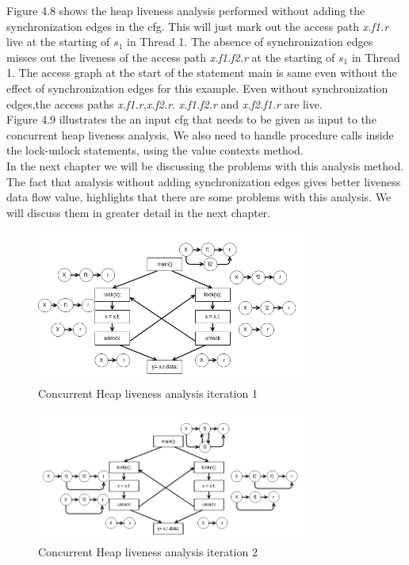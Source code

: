 Figure 4.8 shows the heap liveness analysis performed without adding the synchronization edges in the cfg. This will just mark out the access path \emph{x.f1.r} live at the starting of $s_1$ in Thread 1. The absence of synchronization edges misses out the liveness of the access path \emph{x.f1.f2.r} at the starting of $s_1$ in Thread 1. The access graph at the start of the statement main is same even without the effect of synchronization edges for this example. Even without synchronization edges,the access paths \emph{x.f1.r},\emph{x.f2.r}. \emph{x.f1.f2.r} and \emph{x.f2.f1.r} are live. \\

Figure 4.9 illustrates the an input cfg that needs to be given as input to the concurrent heap liveness analysis. We also  need to handle procedure calls inside the lock-unlock statements, using the value contexts method. \\

In the next chapter we will be discussing the problems with this analysis method. The fact that analysis without adding synchronization edges gives better liveness data flow value, highlights that there are some problems with this analysis. We will discuss them in greater detail in the next chapter. 

\begin{figure}
	\centering
	\includegraphics[width=0.8\textwidth]{Figures/conc_analysis_itr1.png}
	\caption{Concurrent Heap liveness analysis iteration 1}
	\label{fig:nullpointeranalysis}
\end{figure}

\begin{figure}
	\centering
	\includegraphics[width=0.8\textwidth]{Figures/conc_analysis_itr2.png}
	\caption{Concurrent Heap liveness analysis iteration 2}
	\label{fig:nullpointeranalysis}
\end{figure}

